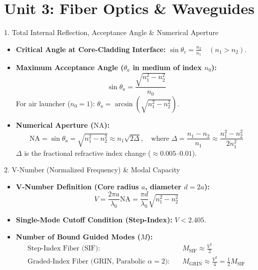 \chapter{Unit 3: Fiber Optics \& Waveguides}

\begin{formulabox}{1. Total Internal Reflection, Acceptance Angle \& Numerical Aperture}
\begin{itemize}[leftmargin=*,itemsep=2pt]
    \item \textbf{Critical Angle at Core-Cladding Interface:} $\sin\theta_c = \frac{n_2}{n_1} \quad (n_1 > n_2)$.
    \item \textbf{Maximum Acceptance Angle ($\theta_a$ in medium of index $n_0$):}
    \[
    \sin\theta_a = \frac{\sqrt{n_1^2 - n_2^2}}{n_0}
    \]
    For air launcher ($n_0 = 1$): $\theta_a = \arcsin\left(\sqrt{n_1^2 - n_2^2}\right)$.
    \item \textbf{Numerical Aperture ($\text{NA}$):}
    \[
    \text{NA} = \sin\theta_a = \sqrt{n_1^2 - n_2^2} \approx n_1 \sqrt{2\Delta}, \quad \text{where } \Delta = \frac{n_1 - n_2}{n_1} \approx \frac{n_1^2 - n_2^2}{2n_1^2}
    \]
    $\Delta$ is the fractional refractive index change ($\approx 0.005\text{--}0.01$).
\end{itemize}
\end{formulabox}

\begin{formulabox}{2. V-Number (Normalized Frequency) \& Modal Capacity}
\begin{itemize}[leftmargin=*,itemsep=2pt]
    \item \textbf{V-Number Definition (Core radius $a$, diameter $d = 2a$):}
    \[
    V = \frac{2\pi a}{\lambda_0} \text{NA} = \frac{\pi d}{\lambda_0} \sqrt{n_1^2 - n_2^2}
    \]
    \item \textbf{Single-Mode Cutoff Condition (Step-Index):} $V < 2.405$.
    \item \textbf{Number of Bound Guided Modes ($M$):}
    \begin{align*}
    \text{Step-Index Fiber (SIF):} \quad & M_{\text{SIF}} \approx \frac{V^2}{2} \\
    \text{Graded-Index Fiber (GRIN, Parabolic $\alpha=2$):} \quad & M_{\text{GRIN}} \approx \frac{V^2}{4} = \frac{1}{2} M_{\text{SIF}}
    \end{align*}
\end{itemize}
\end{formulabox}

